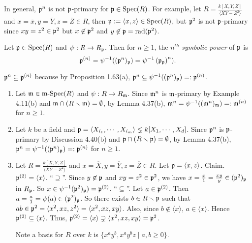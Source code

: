 \begin{example}
    In general, $\mathfrak{p}^{n}$ is not $\mathfrak{p}$-primary for $\mathfrak{p} \in \operatorname{Spec}(R)$. For example, let $R = \frac{k[X,Y,Z]}{\langle XY-Z^{2} \rangle}$ and $x = \overline x,y = \overline Y, z = \overline Z \in R$, then $\mathfrak{p} := \langle x,z \rangle \in \operatorname{Spec}(R)$, but $\mathfrak{p}^{2}$ is not $\mathfrak{p}$-primary since $xy = z^{2} \in \mathfrak{p}^{2}$ but $x \not \in \mathfrak{p}^{2}$ and $y \not \in \mathfrak{p} = \operatorname{rad}(\mathfrak{p}^{2})$.
\end{example}

\begin{definition}
    Let $\mathfrak{p} \in \operatorname{Spec}(R)$ and $\psi: R \to R_{\mathfrak{p}}$. Then for $n \geq 1$, the $n^{th}$ \emph{symbolic power} of $\mathfrak{p}$ is \[\mathfrak{p}^{(n)} = \psi^{-1}((\mathfrak{p}^{n})_{\mathfrak{p}}) = \psi^{-1}\left( \mathfrak{p}_{\mathfrak{p}} \right)^{n}).\] 
\end{definition}

\begin{note}
    $\mathfrak{p}^{n} \subseteq \mathfrak{p}^{(n)}$ because by Proposition 1.63(a), $\mathfrak{p}^{n} \subseteq \psi^{-1}((\mathfrak{p}^{n})_{\mathfrak{p}}) =: \mathfrak{p}^{(n)}$.
\end{note}

\begin{example}
    \begin{enumerate}
        \item 
            Let $\mathfrak{m} \in \operatorname{m-Spec}(R)$ and $\psi: R \to R_{\mathfrak{m}}$. Since $\mathfrak{m}^{n}$ is $\mathfrak{m}$-primary by Example 4.11(b) and $\mathfrak{m} \cap (R \smallsetminus \mathfrak{m}) = \emptyset$, by Lemma 4.37(b), $\mathfrak{m}^{n} = \psi^{-1}((\mathfrak{m}^{n})_{\mathfrak{m}}) =: \mathfrak{m}^{(n)}$ for $n \geq 1$. 
        \item Let $k$ be a field and $\mathfrak{p} = \langle X_{i_1}, \cdots, X_{i_m} \rangle \lneq k[X_1,\cdots,X_d]$. Since $\mathfrak{p}^{n}$ is $\mathfrak{p}$-primary by Discussion 4.40(b) and $\mathfrak{p} \cap (R \smallsetminus \mathfrak{p}) = \emptyset$, by Lemma 4.37(b), $\mathfrak{p}^{n} = \psi^{-1}((\mathfrak{p}^{n})_{\mathfrak{p}}) =: \mathfrak{p}^{(n)}$ for $n \geq 1$.
        \item Let $R = \frac{k[X,Y,Z]}{\langle XY-Z^{2} \rangle}$ and $x = \overbar X, y = \overline Y, z = \overbar Z \in R$. Let $\mathfrak{p} = \langle x, z \rangle$. Claim. $\mathfrak{p}^{(2)} = \langle x \rangle$. ``$\supseteq$''. Since $y \not \in \mathfrak{p}$ and $xy = z^{2} \in \mathfrak{p}^{2}$, we have $x = \frac{x}{1} = \frac{xy}{y} \in (\mathfrak{p}^{2})_{\mathfrak{p}}$ in $R_{\mathfrak{p}}$. So $x \in \psi^{-1}(\mathfrak{p}^{2})_{\mathfrak{p}}) = \mathfrak{p}^{(2)}$. ``$\subseteq$''. Let $a \in \mathfrak{p}^{(2)}$. Then $a = \frac{a}{1} = \psi(a) \in (\mathfrak{p}^{2})_{\mathfrak{p}}$. So there exists $b \in R \smallsetminus \mathfrak{p}$ such that $ab \in \mathfrak{p}^{2} = \langle x^{2},xz,z^{2} \rangle = \langle x^{2}, xz,xy \rangle$. Also, since $b \not \in \langle x \rangle$, $a \in \langle x \rangle$. Hence $\mathfrak{p}^{(2)} \subseteq \langle x \rangle$. Thus, $\mathfrak{p}^{(2)} = \langle x \rangle \supsetneq \langle x^{2},xz,xy \rangle = \mathfrak{p}^{2}$. \par Note a basis for $R$ over $k$ is $\{x^{a}y^{b},x^{a}y^{b}z \mid a,b \geq 0\}$. 
    \end{enumerate}
\end{example}

